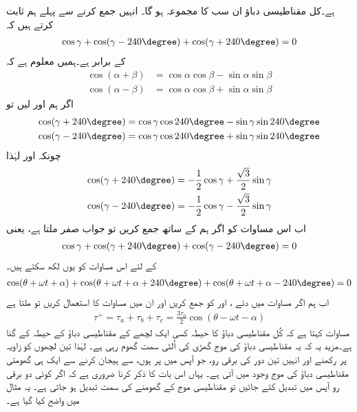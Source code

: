 ہے۔کل مقناطیسی دباؤ  ان سب کا مجموعہ ہو گا۔ انہیں جمع کرنے سے پہلے ہم ثابت کرتے ہیں کہ
\begin{align*}
\cos \gamma +\cos (\gamma -240\degree)+\cos (\gamma+240\degree)=0
\end{align*}
کے برابر ہے۔ہمیں معلوم ہے کہ 
\begin{align*}
\cos  (\alpha +\beta)&=\cos \alpha \cos \beta-\sin \alpha \sin \beta\\
\cos  (\alpha -\beta)&=\cos \alpha \cos \beta+\sin \alpha \sin \beta
\end{align*}
اگر ہم  اور  لیں تو
\begin{align*}
\cos (\gamma+240\degree)&=\cos \gamma \cos 240\degree-\sin \gamma \sin 240\degree\\
\cos (\gamma-240\degree)&=\cos \gamma \cos 240\degree+\sin \gamma \sin 240\degree
\end{align*}
چونکہ  اور  لہٰذا
\begin{align*}
\cos (\gamma+240\degree)&=-\frac{1}{2}\cos \gamma +\frac{\sqrt{3}}{2}\sin \gamma\\
\cos (\gamma-240\degree)&=-\frac{1}{2}\cos \gamma -\frac{\sqrt{3}}{2}\sin \gamma
\end{align*}
اب اس مساوات کو اگر ہم   کے ساتھ جمع کریں تو جواب صفر ملتا ہے، یعنی
\begin{align*}
\cos \gamma +\cos (\gamma+240\degree)+\cos (\gamma-240\degree)=0
\end{align*}
 کے لئے اس مساوات کو یوں لکھ سکتے ہیں۔
\begin{align}\label{مساوات_تبادلہ_تین_سمتیات_جمع_صفر}
\cos (\theta +\omega t +\alpha) +\cos (\theta +\omega t +\alpha+240\degree)+\cos (\theta+\omega t +\alpha-240\degree)=0
\end{align}
اب ہم  اگر مساوات   میں دئے   ،  اور   کو جمع کریں اور ان میں مساوات   کا استعمال کریں تو ملتا ہے
\begin{align}\label{مساوات_تبادلہ_گھومتا_موج}
\tau^+=\tau_a+\tau_b+\tau_c=\frac{3 \tau_0}{2} \cos (\theta -\omega t -\alpha)
\end{align}
مساوات  کہتا ہے کہ کُل مقناطیسی دباؤ کا حیطہ کسی ایک لچھے کے مقناطیسی دباؤ کے حیطہ کے  گنا ہے۔مزید یہ کہ یہ مقناطیسی دباؤ کی موج گھڑی کی اُلٹی سمت گھوم رہی ہے۔ لہٰذا تین لچھوں کو   زاویہ پر رکھنے اور انہیں تین دور کی برقی رو، جو آپس میں  پر ہوں،  سے  ہیجان کرنے سے ایک ہی گھومتی مقناطیسی دباؤ کی موج وجود میں آتی ہے۔ یہاں اس بات کا ذکر کرنا ضروری ہے کہ اگر کوئی دو برقی رو آپس میں تبدیل کئے جائیں تو مقناطیسی موج کے گھومنے کی سمت تبدیل ہو جاتی ہے۔  یہ مثال میں واضح کیا گیا ہے۔


